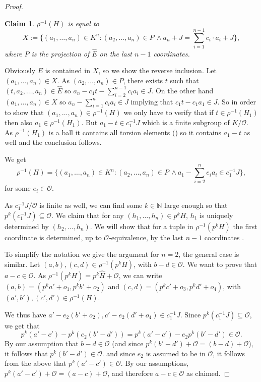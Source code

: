 \documentclass[11pt]{amsart}
\newtheorem{claim}{Claim}[theorem]
\theoremstyle{definition}
\newcommand{\Nn}{{\mathbb{N}}}
\newcommand{\CO}{{\mathcal O}}
\newcommand{\0}{\emptyset}
\def\sub{\subseteq}
\newenvironment{claimproof}[1][\proofname]
  {%
    \proof[#1]%
      \renewcommand*\qedsymbol{$\square$ (claim)}%
  }
  {%
    \endproof%
  }
\begin{document}
\begin{proof}
		\begin{claim}
			$\rho^{-1}(H)$ is equal to
			\[X:=\{(a_1,\dots,a_n)\in K^n:(a_2,\dots,a_n)\in P\, \wedge a_n+J= \sum_{i=1}^{n-1} c_i\cdot a_i+J\},\] where $P$ is the projection of $\widehat E$ on the last $n-1$ coordinates.
		\end{claim}
		\begin{claimproof}
			Obviously $\widehat E$ is contained in $X$, so we show the reverse inclusion.  Let $(a_1,\dots,a_n)\in X$. As $(a_2,\dots,a_n)\in P$, there exists $t$ such that $(t,a_2,\dots,a_n)\in  \widehat E$ so $a_n- c_1t -\sum_{i=2}^{n-1}c_ia_i\in J$. On the other hand $(a_1,\dots,a_n)\in X$ so $a_n-\sum_{i=1}^n c_ia_i\in J$ implying that $c_1t-c_1a_1\in J$.
			So in order to show that $(a_1,\dots,a_n)\in \rho^{-1}(H)$ we only have to verify that if $t\in \rho^{-1}(H_1)$ then also $a_1\in \rho^{-1}(H_1)$. But $a_1-t\in c_1^{-1}J$ which is a finite subgroup of $K/\CO$. As $\rho^{-1}(H_1)$  is a ball it contains all torsion elements (\cite[Fact 3.1, Lemma 3.10]{HaHaPeGps}) so it contains $a_1-t$ as well and the conclusion follows.
		\end{claimproof}
		
		We get 
		\[\rho^{-1}(H) =\{(a_1,\dots,a_n)\in K^n:(a_2,\dots,a_n)\in P\, \wedge a_1-\sum_{i=2}^n e_ia_i\in c_1^{-1}J\},\] for some $e_i\in \CO$.
		
		As $c_1^{-1}J/\CO$ is finite as well, we can find some  $k\in \Nn$ large enough so that $p^k(c_1^{-1}J)\subseteq \CO$. We claim that for any $(h_1,\dots,h_n)\in p^kH$, $h_1$ is uniquely determined by $(h_2,\dots,h_{n})$. We will show that for a tuple in $\rho^{-1}(p^kH)$ the first coordinate is  determined, up to  $\CO$-equivalence, by the last $n-1$ coordinates .
		
		To simplify the notation we give the argument for $n=2$,  the general case is similar. Let $(a,b),(c,d)\in \rho^{-1}(p^kH)$, with  $b-d\in \CO$. We want to prove that $a-c\in \CO$. As $\rho^{-1}(p^kH)=p^k\widehat H+\CO$, we can write $(a,b)=(p^ka'+o_1,p^kb'+o_2)$
		and $(c,d)=(p^kc'+o_3,p^kd'+o_4)$, with $(a',b'),(c',d')\in \rho^{-1}(H)$.
		
		We thus have 
		$a'-e_2(b'+o_2), c'-e_2(d'+o_4) \in c_1^{-1}J$. Since $p^k(c_1^{-1}J)\sub \CO$, we get that  
		\[p^k(a'-c')-p^k(e_2(b'-d'))=p^k(a'-c')-e_2p^k(b'-d')\in \CO.\]  
		By our assumption that $b-d\in \CO$ (and since $p^k(b'-d')+\CO=(b-d)+\CO$), it follows that $p^k(b'-d')\in \CO$. and since $e_2 $ is assumed to be in $\CO$, it follows from the above that $p^k(a'-c')\in \CO$. By our assumptions, $p^k(a'-c')+\CO=(a-c)+\CO$, and therefore $a-c\in \CO$ as claimed.
	\end{proof}
	
\end{document}
